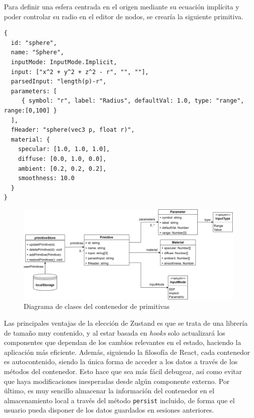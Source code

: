 \begin{ejemplo}
Para definir una esfera centrada en el origen mediante su ecuación implícita y poder controlar su radio en el editor de nodos, se crearía la siguiente primitiva.
\begin{lstlisting}
{
  id: "sphere",
  name: "Sphere",
  inputMode: InputMode.Implicit,
  input: ["x^2 + y^2 + z^2 - r", "", ""],
  parsedInput: "length(p)-r",
  parameters: [
     { symbol: "r", label: "Radius", defaultVal: 1.0, type: "range", range:[0,100] }
  ],
  fHeader: "sphere(vec3 p, float r)",
  material: {
    specular: [1.0, 1.0, 1.0],
    diffuse: [0.0, 1.0, 0.0],
    ambient: [0.2, 0.2, 0.2],
    smoothness: 10.0
  }
}
\end{lstlisting}
\end{ejemplo}

\begin{figure}[ht!]
    \centering
    \includegraphics[width=\textwidth]{Plantilla-TFG-master/img/diagramaZustand.png}
    \caption{Diagrama de clases del contenedor de primitivas}
    \label{fig:contenedorPrim}
\end{figure}

Las principales ventajas de la elección de Zustand es que se trata de una librería de tamaño muy contenido, y al estar basada en \textit{hooks} solo actualizará los componentes que dependan de los cambios relevantes en el estado, haciendo la aplicación más eficiente. Además, siguiendo la filosofía de React, cada contenedor es autocontenido, siendo la única forma de acceder a los datos a través de los métodos del contenedor. Esto hace que sea más fácil debugear, así como evitar que haya modificaciones inesperadas desde algún componente externo. Por último, es muy sencillo almacenar la información del contenedor en el almacenamiento local a través del método \texttt{persist} incluido, de forma que el usuario pueda disponer de los datos guardados en sesiones anteriores.

